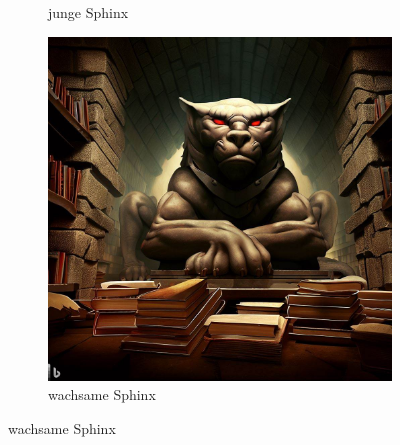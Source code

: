 \documentclass[11pt, twoside]{article}
\begin{document}
\begin{figure}[H]
\begin{subfigure}{0.3\textwidth}
    \caption{junge Sphinx}
  \end{subfigure}%
  \begin{subfigure}{0.3\textwidth}
    \centering
    \includegraphics[width=0.99\linewidth]{sphinx3.jpeg}
    \caption{wachsame Sphinx}
  \end{subfigure}
\end{figure}
\end{document}
